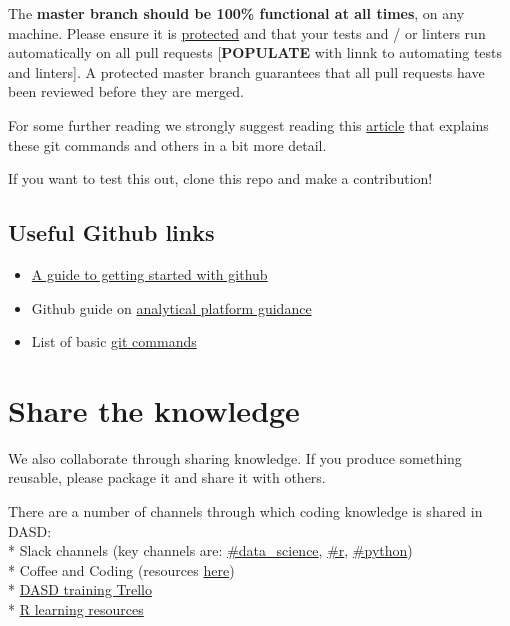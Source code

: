 \documentclass[]{book}
\providecommand{\tightlist}{%
  \setlength{\itemsep}{0pt}\setlength{\parskip}{0pt}}
\begin{document}
The \textbf{master branch should be 100\% functional at all times}, on any machine. Please ensure it is \href{https://help.github.com/articles/about-protected-branches/}{protected} and that your tests and / or linters run automatically on all pull requests {[}\textbf{POPULATE} with linnk to automating tests and linters{]}. A protected master branch guarantees that all pull requests have been reviewed before they are merged.

For some further reading we strongly suggest reading this \href{https://gist.github.com/blackfalcon/8428401}{article} that explains these git commands and others in a bit more detail.

If you want to test this out, clone this repo and make a contribution!

\hypertarget{gitlink}{%
\subsection*{Useful Github links}\label{gitlink}}

\begin{itemize}
\tightlist
\item
  \href{https://jennybc.github.io/2014-05-12-ubc/ubc-r/session2.4_github.html}{A guide to getting started with github}\\
\item
  Github guide on \href{https://user-guidance.services.alpha.mojanalytics.xyz/github.html\#creating-your-project-repo-on-github}{analytical platform guidance}\\
\item
  List of basic \href{https://guides.github.com/introduction/git-handbook/}{git commands}
\end{itemize}

\hypertarget{knowledge}{%
\section{Share the knowledge}\label{knowledge}}

We also collaborate through sharing knowledge. If you produce something reusable, please package it and share it with others.

There are a number of channels through which coding knowledge is shared in DASD:\\
* Slack channels (key channels are: \href{https://app.slack.com/client/T1PU1AP6D/C1Z8Q18LS}{\#data\_science}, \href{https://app.slack.com/client/T1PU1AP6D/C1PUCG719}{\#r}, \href{https://app.slack.com/client/T1PU1AP6D/C1Q09V86S}{\#python})\\
* Coffee and Coding (resources \href{https://github.com/moj-analytical-services/Coffee-and-Coding}{here})\\
* \href{https://trello.com/b/zAwm6sCc/dasd-training}{DASD training Trello}\\
* \href{https://docs.google.com/document/d/1R4hBMf26T9HEnCdVz56PpZhwiCv5RhberYL3BxOSKsA/edit}{R learning resources}
\end{document}
